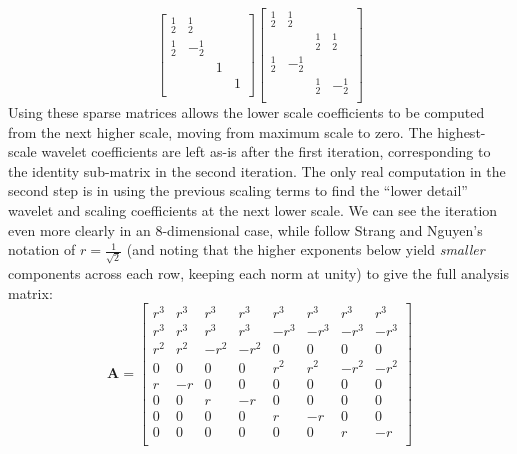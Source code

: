 \documentclass[letterpaper]{article}
\begin{document}
\[
\begin{bmatrix}
^1_2                 &   ^1_2                 &                       &                       \\
^1_2                 &  -^1_2                 &                       &                       \\
                     &                        &   1                   &                       \\
                     &                        &                       &  1                    \\
\end{bmatrix}
\begin{bmatrix}
^1_2                 &   ^1_2                 &                       &                       \\
                     &                        &   ^1_2                &  ^1_2                 \\
^1_2                 &  -^1_2                 &                       &                       \\
                     &                        &  ^1_2                 & -^1_2                 \\
\end{bmatrix}
\]
Using these sparse matrices allows the lower scale coefficients to be computed from the next higher scale, moving from maximum scale to zero.
The highest-scale wavelet coefficients are left as-is after the first iteration,
corresponding to the identity sub-matrix in the second iteration.
The only real computation in the second step is in using the previous scaling terms to find the ``lower detail'' wavelet and scaling coefficients at the next lower scale.
We can see the iteration even more clearly in an 8-dimensional case, while follow Strang and Nguyen's notation of \( r = \frac{1}{\sqrt{2}} \) (and noting that the higher exponents below yield \emph{smaller} components across each row, keeping each norm at unity) to give the full analysis matrix:
\[
\mathbf{A} = 
\begin{bmatrix}
r^3  & r^3  &  r^3  &  r^3  &  r^3  &  r^3  &  r^3  &  r^3  \\
r^3  & r^3  &  r^3  &  r^3  & -r^3  & -r^3  & -r^3  & -r^3  \\
r^2  & r^2  & -r^2  & -r^2  &  0    &  0    &  0    &  0    \\
0    & 0    &  0    &  0    &  r^2  &  r^2  & -r^2  & -r^2  \\
r    & -r   &  0    &  0    &  0    &  0    &  0    &  0    \\
0    & 0    &  r    & -r    &  0    &  0    &  0    &  0    \\
0    & 0    &  0    &  0    &  r    & -r    &  0    &  0    \\
0    & 0    &  0    &  0    &  0    &  0    &  r    & -r    \\
\end{bmatrix}
\]
\end{document}
